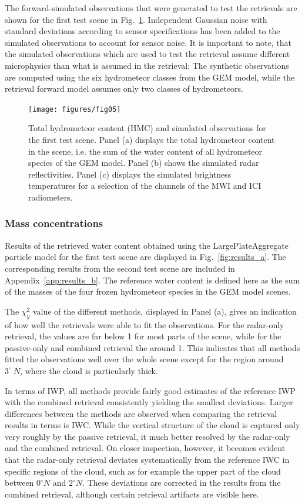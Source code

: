 \documentclass[journal abbreviation, manuscript]{copernicus}
\begin{document}
The forward-simulated observations that were generated to test the retrievals
are shown for the first test scene in Fig.~\ref{fig:observations_a}. Independent
Gaussian noise with standard deviations according to sensor specifications has
been added to the simulated observations to account for sensor noise. It is
important to note, that the simulated observations which are used to test the
retrieval assume different microphysics than what is assumed in the retrieval:
The synthetic observations are computed using the six hydrometeor classes from
the GEM model, while the retrieval forward model assumes only two classes of
hydrometeors.

\begin{figure}
\centering
\texttt{[image: figures/fig05]}
\caption{Total hydrometeor content (HMC) and simulated observations for the first test
  scene. Panel (a) displays the total hydrometeor content in the scene, i.e. the
  sum of the water content of all hydrometeor species of the GEM model. Panel
  (b) shows the simulated radar reflectivities. Panel (c) displays the simulated
  brightness temperatures for a selection of the channels of the MWI and ICI
  radiometers.}
\label{fig:observations_a}
\end{figure}

\subsubsection{Mass concentrations}

Results of the retrieved water content obtained using the LargePlateAggregate
particle model for the first test scene are displayed in
Fig.~\ref{fig:results_a}. The corresponding results from the second test scene
are included in Appendix~\ref{app:results_b}. The reference water content is
defined here as the sum of the masses of the four frozen hydrometeor species in
the GEM model scenes.

The $\chi^2_y$ value of the different methods, displayed
in Panel (a), gives an indication of how well the retrievals were able to fit
the observations. For the radar-only retrieval, the values are far below 1
for most parts of the scene, while for the passive-only and combined retrieval
the around 1. This indicates that all methods fitted the observations well over
the whole scene except for the region around $3^\circ\ N$, where the cloud
is particularly thick.

In terms of IWP, all methods provide fairly good estimates of the reference IWP
with the combined retrieval consistently yielding the smallest deviations.
Larger differences between the methods are observed when comparing the retrieval
results in terms is IWC. While the vertical structure of the cloud is captured
only very roughly by the passive retrieval, it much better resolved by the
radar-only and the combined retrieval. On closer inspection, however, it becomes
evident that the radar-only retrieval deviates systematically from the reference
IWC in specific regions of the cloud, such as for example the upper part of the
cloud between $0^\circ N$ and $2^\circ N$. These deviations are corrected in
the results from the combined retrieval, although certain retrieval artifacts
are visible here.
\end{document}
